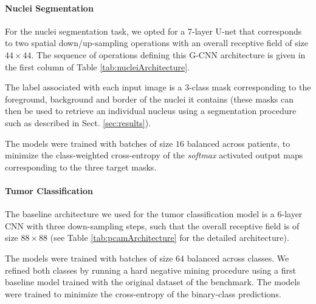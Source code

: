 \documentclass[twocolumn,final]{article}
\begin{document}
\paragraph{Nuclei Segmentation}
For the nuclei segmentation task, we opted for a 7-layer U-net that corresponds to two spatial down/up-sampling operations with an overall receptive field of size $44 \times 44$.
The sequence of operations defining this G-CNN architecture is given in the first column of Table \ref{tab:nucleiArchitecture}.

The label associated with each input image is a 3-class mask corresponding to the foreground, background and border of the nuclei it contains (these masks can then be used to retrieve an individual nucleus using a segmentation procedure such as described in Sect. \ref{sec:results}).

The models were trained with batches of size $16$ balanced across patients, to minimize the class-weighted cross-entropy of the \textit{softmax} activated output maps corresponding to the three target masks.

\paragraph{Tumor Classification}
The baseline architecture we used for the tumor classification model is a 6-layer CNN with three down-sampling steps, such that the overall receptive field is of size $88 \times 88$ (see Table \ref{tab:pcamArchitecture} for the detailed architecture).

The models were trained with batches of size $64$ balanced across classes.
We refined both classes by running a hard negative mining procedure \citep{cirecsan2013mitosis} using a first baseline model trained with the original dataset of the benchmark.
The models were trained to minimize the cross-entropy of the binary-class predictions.
\end{document}
